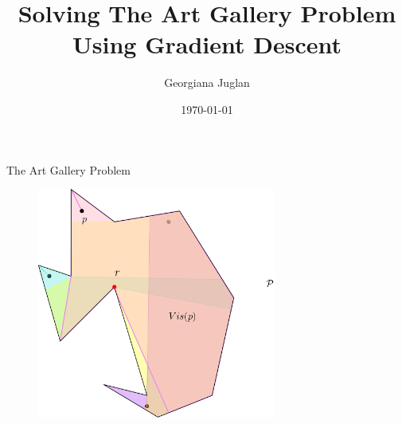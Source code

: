 \documentclass{beamer}
\title{Solving The Art Gallery Problem Using Gradient Descent}
\author{Georgiana Juglan}
\institute{Supervisor: \\ Tillman Miltzow \\ Second Examiner: \\ Frank Staals}
\date{\today}
\begin{document}

\begin{frame}
	\maketitle %
\end{frame}




% 

\begin{frame}{The Art Gallery Problem}
	\begin{figure}
		\centering
		\includegraphics[width = 0.7\textwidth]{Images/p.png}
	\end{figure}
\end{frame}

\end{document}
